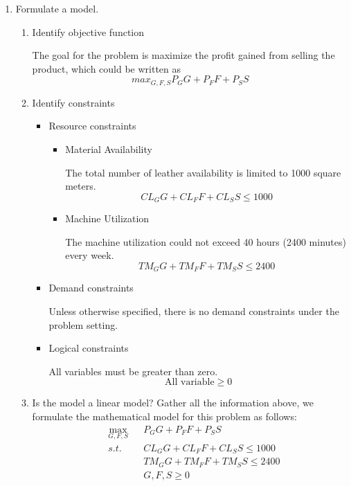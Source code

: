 \documentclass[11pt]{article}
\begin{document}
\begin{enumerate}
\begin{enumerate}
    \item Formulate a model.
    \renewcommand{\labelenumiii}{{\arabic{enumiii}}}
    \begin{enumerate}
        \item Identify objective function\par
        The goal for the problem is maximize the profit gained from selling the product, which could be written as
        $$
        max_{G, F, S} P_GG + P_FF+ P_SS
        $$
        \item Identify constraints \par
        \begin{itemize}
            \item Resource constraints\par
            \begin{itemize}
                \item Material Availability \par
                The total number of leather availability is limited to 1000 square meters.
                $$
                \mathit{CL}_GG+ \mathit{CL}_FF+ \mathit{CL}_SS \leq 1000
                $$
                \item Machine Utilization\par
                The machine utilization could not exceed 40 hours (2400 minutes) every week.
                $$
                \mathit{TM}_GG + \mathit{TM}_FF+\mathit{TM}_SS \leq 2400
                $$
            \end{itemize}
            \item Demand constraints\par
            Unless otherwise specified, there is no demand constraints under the problem setting.
            \item Logical constraints\par
            All variables must be greater than zero.
            $$
            \text{All variable} \geq 0
            $$
        \end{itemize}
        \item Is the model a linear model?
        Gather all the information above, we formulate the mathematical model for this problem as follows:
        \begin{align*}
            & \max_{G, F, S} & & P_GG + P_FF+ P_SS  \\
            & s.t. && \mathit{CL}_GG+ \mathit{CL}_FF+ \mathit{CL}_SS \leq 1000 \\
            &&& \mathit{TM}_GG + \mathit{TM}_FF+\mathit{TM}_SS  \leq 2400 \\
            &&& G, F, S \geq 0
        \end{align*}
        

\end{enumerate}
\end{enumerate}
\end{enumerate}
\end{document}
